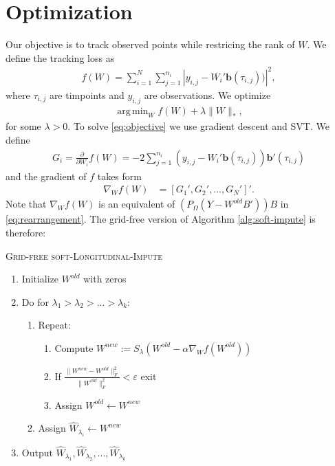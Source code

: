 \documentclass{article}
\newcommand{\bb}{\mathbf{b}}
\DeclareMathOperator*{\argmin}{arg\,min}
\begin{document}
\section{Optimization}
Our objective is to track observed points while restricing the rank of $W$. We define the tracking loss as
\begin{align*}
 f(W) = \sum_{i=1}^N \sum_{j=1}^{n_i}\left|y_{i,j} - W_i' \bb(\tau_{i,j}))\right|^2, %
\end{align*}
where $\tau_{i,j}$ are timpoints and $y_{i,j}$ are observations. We optimize
\begin{align}
\argmin_{W}f(W) + \lambda\|W\|_*,\label{eq:objective}
\end{align}
for some $\lambda > 0$. To solve \eqref{eq:objective} we use gradient descent and SVT. We define
\begin{align*}
 G_i = \frac{\partial}{\partial W_i} f(W) =-2\sum_{j=1}^{n_i} (y_{i,j} - W_i' \bb(\tau_{i,j}))\bb'(\tau_{i,j})
\end{align*}
and the gradient of $f$ takes form
\begin{align*}
 \nabla_W f(W) &= [G_1', G_2', ..., G_N']'.
\end{align*}
Note that $\nabla_W f(W)$ is an equivalent of $(P_\Omega(Y - W^{old}B'))B$ in \eqref{eq:rearrangement}. The grid-free version of Algorithm \ref{alg:soft-impute} is therefore:
\begin{algorithm}\label{algo}
\caption{\textsc{Grid-free soft-Longitudinal-Impute}}
\begin{enumerate}
\item Initialize $W^{old}$ with zeros
\item Do for $\lambda_1 > \lambda_2 > ... > \lambda_k$:
\begin{enumerate}
\item Repeat:
\begin{enumerate}
\item Compute $W^{new} := S_\lambda(W^{old} - \alpha \nabla_W f(W^{old}))$
\item If $\frac{\|W^{new} - W^{old}\|_F^2}{\|W^{old}\|_F^2} < \varepsilon$ exit
\item Assign $W^{old} \leftarrow W^{new}$
\end{enumerate}
\item Assign $\hat{W}_{\lambda_i} \leftarrow W^{new}$
\end{enumerate}
\item Output $\hat{W}_{\lambda_1}, \hat{W}_{\lambda_2}, ... , \hat{W}_{\lambda_k}$
\end{enumerate}
\end{algorithm}
\end{document}
